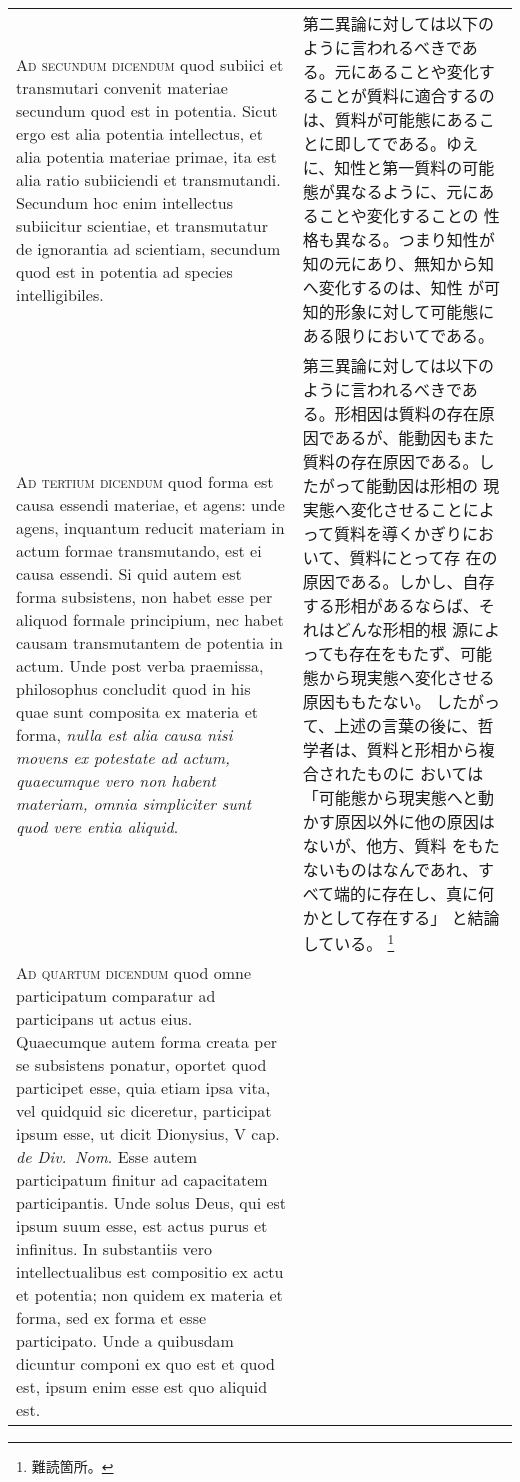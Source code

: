 \documentclass[paper=a4paper,fontsize=10pt,jafontsize=9pt,titlepage]{jlreq}
\begin{document}
\begin{longtable}{p{21em}p{21em}}
\\



{\scshape Ad secundum dicendum} quod subiici et transmutari convenit
materiae secundum quod est in potentia. Sicut ergo est alia potentia
intellectus, et alia potentia materiae primae, ita est alia ratio
subiiciendi et transmutandi. Secundum hoc enim intellectus subiicitur
scientiae, et transmutatur de ignorantia ad scientiam, secundum quod
est in potentia ad species intelligibiles.


&

第二異論に対しては以下のように言われるべきである。元にあることや変化す
ることが質料に適合するのは、質料が可能態にあることに即してである。ゆえ
に、知性と第一質料の可能態が異なるように、元にあることや変化することの
性格も異なる。つまり知性が知の元にあり、無知から知へ変化するのは、知性
が可知的形象に対して可能態にある限りにおいてである。

\\



{\scshape Ad tertium dicendum} quod forma est causa essendi materiae,
et agens: unde agens, inquantum reducit materiam in actum formae
transmutando, est ei causa essendi. Si quid autem est forma
subsistens, non habet esse per aliquod formale principium, nec habet
causam transmutantem de potentia in actum. Unde post verba praemissa,
philosophus concludit quod in his quae sunt composita ex materia et
forma, {\itshape nulla est alia causa nisi movens ex potestate ad
actum, quaecumque vero non habent materiam, omnia simpliciter sunt
quod vere entia aliquid}.


&

第三異論に対しては以下のように言われるべきである。形相因は質料の存在原
因であるが、能動因もまた質料の存在原因である。したがって能動因は形相の
現実態へ変化させることによって質料を導くかぎりにおいて、質料にとって存
在の原因である。しかし、自存する形相があるならば、それはどんな形相的根
源によっても存在をもたず、可能態から現実態へ変化させる原因ももたない。
したがって、上述の言葉の後に、哲学者は、質料と形相から複合されたものに
おいては「可能態から現実態へと動かす原因以外に他の原因はないが、他方、質料
をもたないものはなんであれ、すべて端的に存在し、真に何かとして存在する」
と結論している。
\footnote{難読箇所。}

\\



{\scshape Ad quartum dicendum} quod omne participatum comparatur ad
participans ut actus eius. Quaecumque autem forma creata per se
subsistens ponatur, oportet quod participet esse, quia etiam ipsa
vita, vel quidquid sic diceretur, participat ipsum esse, ut dicit
Dionysius, V cap. {\itshape de Div.~Nom}. Esse autem participatum finitur ad
capacitatem participantis. Unde solus Deus, qui est ipsum suum esse,
est actus purus et infinitus. In substantiis vero intellectualibus est
compositio ex actu et potentia; non quidem ex materia et forma, sed ex
forma et esse participato. Unde a quibusdam dicuntur componi ex quo
est et quod est, ipsum enim esse est quo aliquid est.



\end{longtable}
\end{document}
